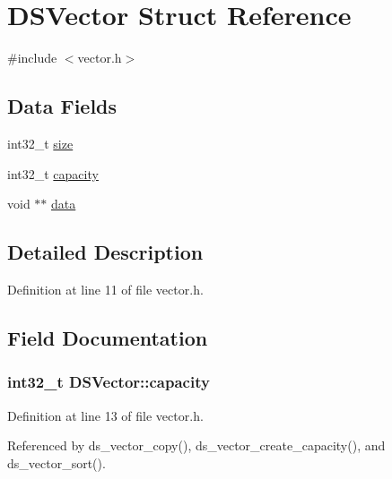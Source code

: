 \hypertarget{structDSVector}{}\section{D\+S\+Vector Struct Reference}
\label{structDSVector}


{\ttfamily \#include $<$vector.\+h$>$}

\subsection*{Data Fields}
\begin{DoxyCompactItemize}
\item 
int32\+\_\+t \hyperlink{structDSVector_aec38b0e8c644101c621177cf1c298793}{size}
\item 
int32\+\_\+t \hyperlink{structDSVector_aadb545706790ded804cd1331d9277d91}{capacity}
\item 
void $\ast$$\ast$ \hyperlink{structDSVector_a20b72155d8e63dbc5fb5f1f0259c3d0f}{data}
\end{DoxyCompactItemize}


\subsection{Detailed Description}


Definition at line 11 of file vector.\+h.



\subsection{Field Documentation}
\subsubsection[{\texorpdfstring{capacity}{capacity}}]{\setlength{\rightskip}{0pt plus 5cm}int32\+\_\+t D\+S\+Vector\+::capacity}\hypertarget{structDSVector_aadb545706790ded804cd1331d9277d91}{}\label{structDSVector_aadb545706790ded804cd1331d9277d91}


Definition at line 13 of file vector.\+h.



Referenced by ds\+\_\+vector\+\_\+copy(), ds\+\_\+vector\+\_\+create\+\_\+capacity(), and ds\+\_\+vector\+\_\+sort().

